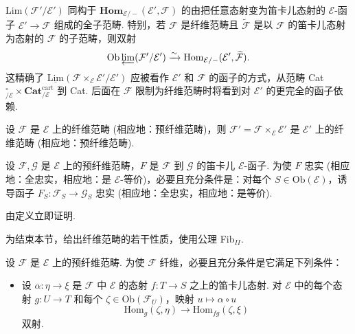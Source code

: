 \begin{corollary}\label{cor:VI.6.8}
Lim$(\mathcal{F}'/\mathcal{E}')$ 同构于 $\mathbf{Hom}_{\mathcal{E}/-}(\mathcal{E}', \mathcal{F})$ 的由把任意态射变为笛卡儿态射的 $\mathcal{E}$-函子 $\mathcal{E}' \to \mathcal{F}$ 组成的全子范畴. 特别，若 $\mathcal{F}$ 是纤维范畴且 $\widetilde{\mathcal{F}}$ 是以 $\mathcal{F}$ 的笛卡儿态射为态射的 $\mathcal{F}$ 的子范畴，则双射
\[
\mathrm{Ob} \varprojlim (\mathcal{F}'/\mathcal{E}') \xrightarrow{\sim} \mathrm{Hom}_{\mathcal{E}/-}(\mathcal{E}', \widetilde{\mathcal{F}}).
\]
这精确了 $\underline{\mathrm{Lim}}(\mathcal{F} \times_{\mathcal{E}} \mathcal{E}'/\mathcal{E}')$ 应被看作 $\mathcal{E}'$ 和 $\mathcal{F}$ 的函子的方式，从范畴 Cat$^{\circ}_{/\mathcal{E}} \times \mathbf{Cat}^{\mathrm{cart}}_{/\mathcal{E}}$ 到 Cat. 后面在 $\mathcal{F}$ 限制为纤维范畴时将看到对 $\mathcal{E}'$ 的更完全的函子依赖.
\end{corollary}

\begin{corollary}\label{cor:VI.6.9}
设 $\mathcal{F}$ 是 $\mathcal{E}$ 上的纤维范畴 (相应地：预纤维范畴)，则 $\mathcal{F}' = \mathcal{F} \times_{\mathcal{E}} \mathcal{E}'$ 是 $\mathcal{E}'$ 上的纤维范畴 (相应地：预纤维范畴).
\end{corollary}

\begin{proposition}\label{prop:VI.6.10}
设 $\mathcal{F}, \mathcal{G}$ 是 $\mathcal{E}$ 上的预纤维范畴，$F$ 是 $\mathcal{F}$ 到 $\mathcal{G}$ 的笛卡儿 $\mathcal{E}$-函子. 为使 $F$ 忠实 (相应地：全忠实，相应地：是 $\mathcal{E}$-等价)，必要且充分条件是：对每个 $S \in \mathrm{Ob}(\mathcal{E})$，诱导函子 $F_S \colon \mathcal{F}_S \to \mathcal{G}_S$ 忠实 (相应地：全忠实，相应地：是等价).
\end{proposition}

由定义立即证明.

为结束本节，给出纤维范畴的若干性质，使用公理 Fib$_{II}$.

\begin{proposition}\label{prop:VI.6.11}
设 $\mathcal{F}$ 是 $\mathcal{E}$ 上的预纤维范畴. 为使 $\mathcal{F}$ 纤维，必要且充分条件是它满足下列条件：
\begin{itemize}\tightlist
\item[Fib$'_{II}$：] 设 $\alpha \colon \eta \to \xi$ 是 $\mathcal{F}$ 中 $\mathcal{E}$ 的态射 $f \colon T \to S$ 之上的笛卡儿态射. 对 $\mathcal{E}$ 中的每个态射 $g \colon U \to T$ 和每个 $\zeta \in \mathrm{Ob}(\mathcal{F}_U)$，映射 $u \mapsto \alpha \circ u$
\[
\mathrm{Hom}_g(\zeta, \eta) \longrightarrow \mathrm{Hom}_{fg}(\zeta, \xi)
\]
双射.
\end{itemize}
\end{proposition}


